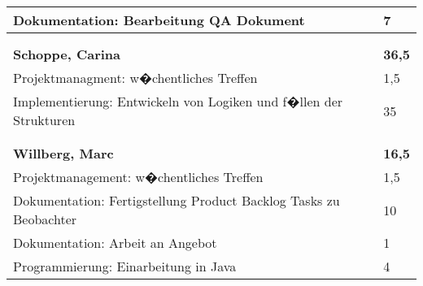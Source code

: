 \documentclass[a4paper,11pt]{scrartcl}
\begin{document}
\begin{longtable}{| p{13.8cm} | C{2.4cm} |}
  Dokumentation: Bearbeitung QA Dokument
	&
  7
	\\
	\hline


	&

	\\
	\hline


	&

	\\
	\hline
	\hline


	\textbf{Schoppe, Carina} & \textbf{36,5}\\ %
	\hline

  Projektmanagment: w�chentliches Treffen
	&
  1,5
	\\
	\hline

  Implementierung: Entwickeln von Logiken und f�llen der Strukturen
	&
  35
	\\
	\hline


	&

	\\
	\hline


	&

	\\
	\hline
	\hline


	\textbf{Willberg, Marc} & \textbf{16,5}\\ %
	\hline

  Projektmanagement: w�chentliches Treffen
	&
  1,5
	\\
	\hline

  Dokumentation: Fertigstellung Product Backlog Tasks zu Beobachter
	&
  10
	\\
	\hline

  Dokumentation: Arbeit an Angebot
	&
  1
	\\
	\hline

  Programmierung: Einarbeitung in Java
	&
  4
	\\
	\hline

\end{longtable}
\end{document}
